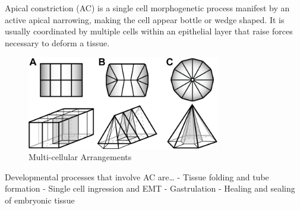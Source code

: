 \documentclass[11pt,singlespacinge,twoside]{reedthesis} %
\begin{document}
Apical constriction (AC) is a single cell morphogenetic process manifest by an active apical narrowing, making the cell appear bottle or wedge shaped. It is usually coordinated by multiple cells within an epithelial layer that raise forces necessary to deform a tissue.
\begin{figure}

{\centering \includegraphics[width=0.75\textwidth]{figures/intro/arrangements} 

}

\caption{Multi-cellular Arrangements}\label{fig:arrange}
\end{figure}
Developmental processes that involve AC are\ldots{}
- Tissue folding and tube formation
- Single cell ingression and EMT
- Gastrulation
- Healing and sealing of embryonic tissue
\end{document}
